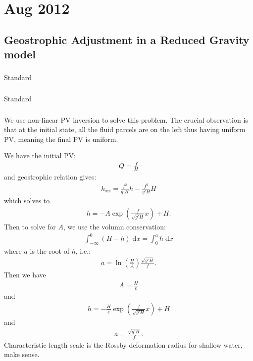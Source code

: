 \documentclass[11pt,letterpaper]{book}
\theoremstyle{definition}
\newcommand{\de}{\mathrm{d}}
\begin{document}
\chapter{Aug 2012}
\section{Geostrophic Adjustment in a Reduced Gravity model}
\subsection{}
Standard

\subsection{}
Standard

\subsection{}
We use non-linear PV inversion to solve this problem. The crucial observation is that at the initial state, all the fluid parcels are on the left thus having uniform PV, meaning the final PV is uniform. 

We have the initial PV:
\begin{align*}
    Q = \frac{f}{H}
\end{align*}
and geostrophic relation gives:
\begin{align*}
    h_{xx} = \frac{f^2}{g' H}h-\frac{f^2}{g' H}H
\end{align*}
which solves to 
\begin{align*}
    h = -A\exp\left(\frac{f}{\sqrt{g'H}}x\right)+H.
\end{align*}
Then to solve for $A$, we use the volumn conservation:
\begin{align*}
    \int^0_{-\infty}(H-h)\;\de x = \int^a_0 h\;\de x
\end{align*}
where $a$ is the root of $h$, i.e.:
\begin{align*}
    a = \ln\left(\frac{H}{A}\right)\frac{\sqrt{g'H}}{f}.
\end{align*}
Then we have
\begin{align*}
    A = \frac{H}{e}
\end{align*}
and
\begin{align*}
    h = -\frac{H}{e}\exp\left(\frac{f}{\sqrt{g'H}}x\right)+H
\end{align*}
and
\begin{align*}
    a = \frac{\sqrt{g'H}}{f}.
\end{align*}
Characteristic length scale is the Rossby deformation radius for shallow water, make sense. 
\end{document}
